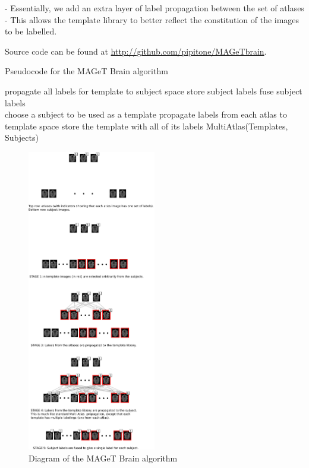 \documentclass{article}\usepackage{graphicx, color}
\begin{document}
- Essentially, we add an extra layer of label propagation between the set of atlases 
- This allows the template library to better reflect the constitution of the images to be labelled.

Source code can be found at \url{http://github.com/pipitone/MAGeTbrain}.

\begin{algorithm}
\caption{Pseudocode for the MAGeT Brain algorithm}
\label{pseudocodesdf}
\begin{algorithmic}
      \State propagate all labels for template to subject space
      \State store subject labels
    \EndFor
    \State fuse subject labels
  \EndFor
\EndFunction
\\
    \State choose a subject to be used as a template
    \State propagate labels from each atlas to template space
    \State store the template with all of its labels
  \EndFor
  \State MultiAtlas(Templates, Subjects)
\EndFunction
\end{algorithmic}
\end{algorithm}

\begin{figure}[h]
  \centering
    \includegraphics[width=0.5\textwidth]{figure/MAGeT-figure.png}
  \caption{Diagram of the MAGeT Brain algorithm}
\end{figure}
\end{document}
